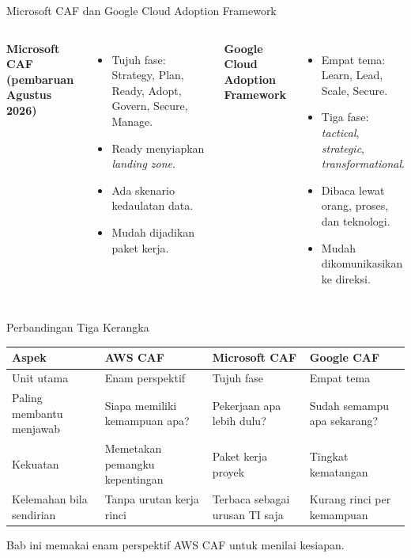 \documentclass[aspectratio=169, table, 12pt]{beamer}
\begin{document}
\begin{frame}{Microsoft CAF dan Google Cloud Adoption Framework}
  \begin{columns}[t]
    \textbf{Microsoft CAF (pembaruan Agustus 2026)}
    \begin{itemize}
      \item Tujuh fase: Strategy, Plan, Ready, Adopt, Govern, Secure, Manage.
      \item Ready menyiapkan \textit{landing zone}.
      \item Ada skenario kedaulatan data.
      \item Mudah dijadikan paket kerja.
    \end{itemize}

    \textbf{Google Cloud Adoption Framework}
    \begin{itemize}
      \item Empat tema: Learn, Lead, Scale, Secure.
      \item Tiga fase: \textit{tactical}, \textit{strategic},
            \textit{transformational}.
      \item Dibaca lewat orang, proses, dan teknologi.
      \item Mudah dikomunikasikan ke direksi.
    \end{itemize}
  \end{columns}
\end{frame}

\begin{frame}{Perbandingan Tiga Kerangka}
  \footnotesize
  \begin{tabularx}{\textwidth}{>{\raggedright\arraybackslash}p{2.6cm}YYY}
    \hline
    \textbf{Aspek} & \textbf{AWS CAF} & \textbf{Microsoft CAF} & \textbf{Google CAF} \\
    \hline
    Unit utama & Enam perspektif & Tujuh fase & Empat tema \\
    \hline
    Paling membantu menjawab & Siapa memiliki kemampuan apa? & Pekerjaan apa lebih dulu?
      & Sudah semampu apa sekarang? \\
    \hline
    Kekuatan & Memetakan pemangku kepentingan & Paket kerja proyek & Tingkat kematangan
      \\
    \hline
    Kelemahan bila sendirian & Tanpa urutan kerja rinci & Terbaca sebagai urusan TI
      saja & Kurang rinci per kemampuan \\
    \hline
  \end{tabularx}

  \vspace{8pt}
  Bab ini memakai enam perspektif AWS CAF untuk menilai kesiapan.
\end{frame}
\end{document}
